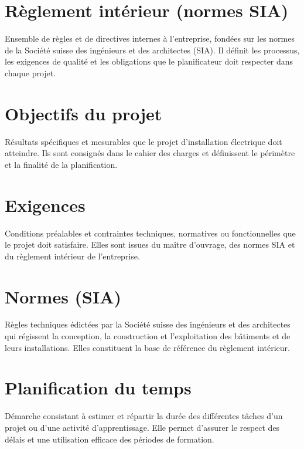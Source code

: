 \documentclass[a4paper,12pt,answers,addpoints]{exam}
\begin{document}
\begin{questions}
\begin{parts}
			\part[1]{Règlement intérieur (normes SIA)}
			\begin{solution}
				Ensemble de règles et de directives internes à l'entreprise, fondées sur les normes de la Société suisse des ingénieurs et des architectes (SIA). Il définit les processus, les exigences de qualité et les obligations que le planificateur doit respecter dans chaque projet.
			\end{solution}
			
			\part[1]{Objectifs du projet}
			\begin{solution}
				Résultats spécifiques et mesurables que le projet d'installation électrique doit atteindre. Ils sont consignés dans le cahier des charges et définissent le périmètre et la finalité de la planification.
			\end{solution}
			
			\part[1]{Exigences}
			\begin{solution}
				Conditions préalables et contraintes techniques, normatives ou fonctionnelles que le projet doit satisfaire. Elles sont issues du maître d'ouvrage, des normes SIA et du règlement intérieur de l'entreprise.
			\end{solution}
			
			\part[1]{Normes (SIA)}
			\begin{solution}
				Règles techniques édictées par la Société suisse des ingénieurs et des architectes qui régissent la conception, la construction et l'exploitation des bâtiments et de leurs installations. Elles constituent la base de référence du règlement intérieur.
			\end{solution}
			
			\part[1]{Planification du temps}
			\begin{solution}
				Démarche consistant à estimer et répartir la durée des différentes tâches d'un projet ou d'une activité d'apprentissage. Elle permet d'assurer le respect des délais et une utilisation efficace des périodes de formation.
			\end{solution}
			

\end{parts}
\end{questions}
\end{document}
